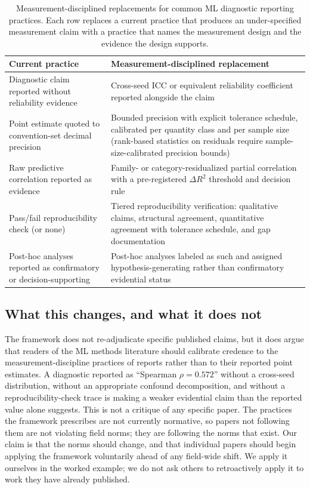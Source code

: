 \documentclass[10pt]{article}
\begin{document}
\begin{table}[h]
\centering
\small
\begin{tabular}{p{}p{}}
\toprule
Current practice & Measurement-disciplined replacement \\
\midrule
Diagnostic claim reported without reliability evidence
  & Cross-seed ICC or equivalent reliability coefficient reported
    alongside the claim \\
Point estimate quoted to convention-set decimal precision
  & Bounded precision with explicit tolerance schedule, calibrated
    per quantity class and per sample size (rank-based statistics
    on residuals require sample-size-calibrated precision bounds) \\
Raw predictive correlation reported as evidence
  & Family- or category-residualized partial correlation with a
    pre-registered $\Delta R^2$ threshold and decision rule \\
Pass/fail reproducibility check (or none)
  & Tiered reproducibility verification: qualitative claims,
    structural agreement, quantitative agreement with tolerance
    schedule, and gap documentation \\
Post-hoc analyses reported as confirmatory or
  decision-supporting
  & Post-hoc analyses labeled as such and assigned
    hypothesis-generating rather than confirmatory evidential
    status \\
\bottomrule
\end{tabular}
\caption{Measurement-disciplined replacements for common ML
  diagnostic reporting practices. Each row replaces a current
  practice that produces an under-specified measurement claim
  with a practice that names the measurement design and the
  evidence the design supports.}
\label{tab:reporting-standard}
\end{table}

\subsection{What this changes, and what it does not}

The framework does not re-adjudicate specific published claims, but
it does argue that readers of the ML methods literature should
calibrate credence to the measurement-discipline practices of
reports rather than to their reported point estimates. A diagnostic
reported as ``Spearman $\rho = 0.572$'' without a cross-seed
distribution, without an appropriate confound decomposition, and
without a reproducibility-check trace is making a weaker
evidential claim than the reported value alone suggests. This is
not a critique of any specific paper.
The practices the framework prescribes are not currently normative,
so papers not following them are not violating field norms; they
are following the norms that exist. Our claim is that the norms
should change, and that individual papers should begin applying the
framework voluntarily ahead of any field-wide shift. We apply it
ourselves in the worked example; we do not ask others to retroactively apply it
to work they have already published.
\end{document}
